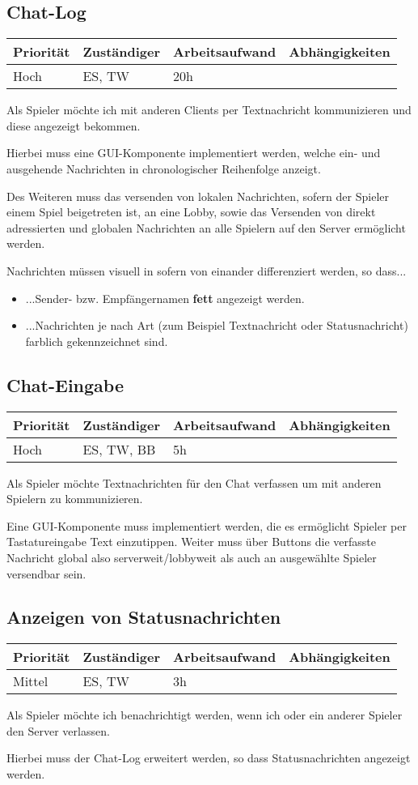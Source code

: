 \documentclass[a4paper]{scrreprt}
\newenvironment{requirement}[5] {
	\subsection{#1}
	\begin{tabularx}{\textwidth}{|X|l|X|X|}
		\hline
		Priorität & Zuständiger & Arbeitsaufwand & Abhängigkeiten \\
		\hline
		#2 & #3 & #4 & #5 \\
		\hline
	\end{tabularx}
	}{
	\newpage
	}
\begin{document}
\begin{requirement}{Chat-Log}{Hoch}{ES, TW}{20h}{}

\begin{center}
Als Spieler möchte ich mit anderen Clients per Textnachricht kommunizieren und diese angezeigt bekommen.
\end{center}

Hierbei muss eine GUI-Komponente implementiert werden, welche ein- und ausgehende Nachrichten in chronologischer Reihenfolge anzeigt.

Des Weiteren muss das versenden von lokalen Nachrichten, sofern der Spieler einem Spiel beigetreten ist, an eine Lobby, sowie das Versenden von direkt adressierten und \glqq globalen\grqq{} Nachrichten an alle Spielern auf den Server ermöglicht werden.

Nachrichten müssen visuell in sofern von einander differenziert werden, so dass...
\begin{itemize}
	\item ...Sender- bzw. Empfängernamen \textbf{fett} angezeigt werden.
	\item ...Nachrichten je nach Art (zum Beispiel Textnachricht oder Statusnachricht) farblich gekennzeichnet sind.
\end{itemize}
\end{requirement}


\begin{requirement}{Chat-Eingabe}{Hoch}{ES, TW, BB}{5h}{}

\begin{center}
	Als Spieler möchte Textnachrichten für den Chat verfassen um mit anderen Spielern zu kommunizieren.
\end{center}

Eine GUI-Komponente muss implementiert werden, die es ermöglicht Spieler per Tastatureingabe Text einzutippen. Weiter muss über Buttons die verfasste Nachricht \glqq global\grqq{} also serverweit/lobbyweit als auch an ausgewählte Spieler versendbar sein.

\end{requirement}


\begin{requirement}{Anzeigen von Statusnachrichten}{Mittel}{ES, TW}{3h}{}

\begin{center}
	Als Spieler möchte ich benachrichtigt werden, wenn ich oder ein anderer Spieler den Server verlassen.
\end{center}

Hierbei muss der Chat-Log erweitert werden, so dass Statusnachrichten angezeigt werden.

\end{requirement}
\end{document}
